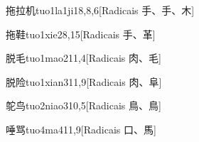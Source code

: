 \begin{entry}{拖拉机}{tuo1la1ji1}{8,8,6}[Radicais ⼿、⼿、⽊]
\end{entry}

\begin{entry}{拖鞋}{tuo1xie2}{8,15}[Radicais ⼿、⾰]
\end{entry}

\begin{entry}{脱毛}{tuo1mao2}{11,4}[Radicais ⾁、⽑]
\end{entry}

\begin{entry}{脱险}{tuo1xian3}{11,9}[Radicais ⾁、⾩]
\end{entry}

\begin{entry}{鸵鸟}{tuo2niao3}{10,5}[Radicais ⿃、⿃]
\end{entry}

\begin{entry}{唾骂}{tuo4ma4}{11,9}[Radicais ⼝、⾺]
\end{entry}


